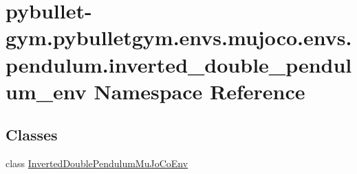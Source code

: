\hypertarget{namespacepybullet-gym_1_1pybulletgym_1_1envs_1_1mujoco_1_1envs_1_1pendulum_1_1inverted__double__pendulum__env}{}\section{pybullet-\/gym.pybulletgym.\+envs.\+mujoco.\+envs.\+pendulum.\+inverted\+\_\+double\+\_\+pendulum\+\_\+env Namespace Reference}
\label{namespacepybullet-gym_1_1pybulletgym_1_1envs_1_1mujoco_1_1envs_1_1pendulum_1_1inverted__double__pendulum__env}
\subsection*{Classes}
\begin{DoxyCompactItemize}
\item 
class \hyperlink{classpybullet-gym_1_1pybulletgym_1_1envs_1_1mujoco_1_1envs_1_1pendulum_1_1inverted__double__pende0cbd4e243b5fa20c9b42e2de7690554}{Inverted\+Double\+Pendulum\+Mu\+Jo\+Co\+Env}
\end{DoxyCompactItemize}
